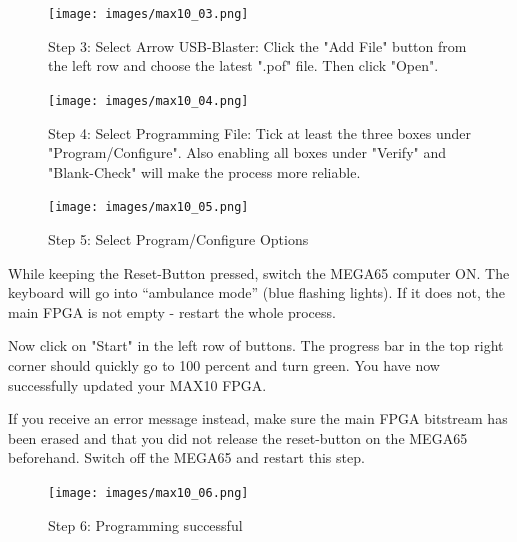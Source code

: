 \begin{figure}[H]
  \centering
  \texttt{[image: images/max10\_03.png]}
  \captionsetup{width=0.8\linewidth}
  \caption{Step 3: Select Arrow USB-Blaster:
           Click the "Add File" button from the left row and choose the
           latest ".pof" file. Then click "Open".}
  \label{fig:max10_03}
\end{figure}


\begin{figure}[H]
  \centering
  \texttt{[image: images/max10\_04.png]}
  \captionsetup{width=0.7\linewidth}
  \caption{Step 4: Select Programming File:
           Tick at least the three boxes under "Program/Configure".
           Also enabling all boxes under "Verify" and "Blank-Check"
           will make the process more reliable.}
  \label{fig:max10_04}

\vspace{5mm}

  \texttt{[image: images/max10\_05.png]}
  \captionsetup{width=0.7\linewidth}
  \caption{Step 5: Select Program/Configure Options}
  \label{fig:max10_05}
\end{figure}

While keeping the Reset-Button pressed, switch the MEGA65 computer ON.
The keyboard will go into ``ambulance mode'' (blue flashing lights).
If it does not, the main FPGA is not empty - restart the whole process.

Now click on "Start" in the left row of buttons. The progress bar in
the top right corner should quickly go to 100 percent and turn green.
You have now successfully updated your MAX10 FPGA.

If you receive an error message instead, make sure the main FPGA
bitstream has been erased and that you did not release the reset-button on
the MEGA65 beforehand. Switch off the MEGA65 and restart this step.

\begin{figure}[H]
  \centering
  \texttt{[image: images/max10\_06.png]}
  \captionsetup{width=0.8\linewidth}
  \caption{Step 6: Programming successful}
  \label{fig:max10_06}
\end{figure}

